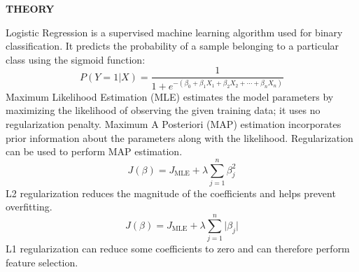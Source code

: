 \documentclass[11pt,twoside]{article}
\newcommand{\expheading}[1]{{\fontsize{14}{17}\selectfont\textbf{#1}\par}}
\begin{document}
{\expheading{THEORY}
\vspace{4pt}
Logistic Regression is a supervised machine learning algorithm used for binary classification. It predicts the probability of a sample belonging to a particular class using the sigmoid function:
\[P(Y=1|X)=\frac{1}{1+e^{-(\beta_0+\beta_1X_1+\beta_2X_2+\cdots+\beta_nX_n)}}\]
Maximum Likelihood Estimation (MLE) estimates the model parameters by maximizing the likelihood of observing the given training data; it uses no regularization penalty. Maximum A Posteriori (MAP) estimation incorporates prior information about the parameters along with the likelihood. Regularization can be used to perform MAP estimation.
\[J(\beta)=J_{\text{MLE}}+\lambda\sum_{j=1}^{n}\beta_j^2\]
L2 regularization reduces the magnitude of the coefficients and helps prevent overfitting.
\[J(\beta)=J_{\text{MLE}}+\lambda\sum_{j=1}^{n}\lvert\beta_j\rvert\]
L1 regularization can reduce some coefficients to zero and can therefore perform feature selection.
\vspace{4pt}

}
\end{document}
